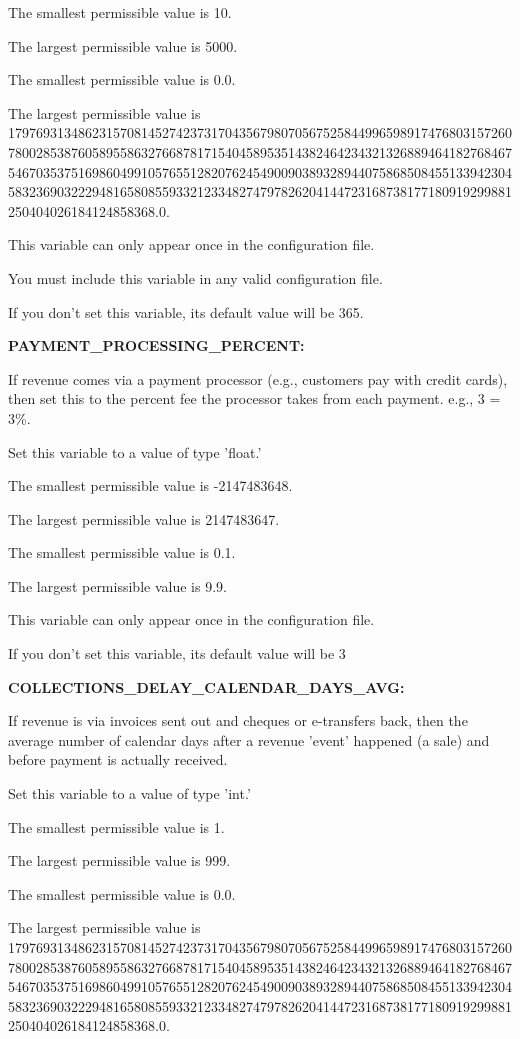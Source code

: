The smallest permissible value is 10.

The largest permissible value is 5000.

The smallest permissible value is 0.0.

The largest permissible value is 179769313486231570814527423731704356798070567525844996598917476803157260780028538760589558632766878171540458953514382464234321326889464182768467546703537516986049910576551282076245490090389328944075868508455133942304583236903222948165808559332123348274797826204144723168738177180919299881250404026184124858368.0.

This variable can only appear once in the configuration file.

You must include  this variable in any valid configuration file.

If you don't set this variable, its default value will be 365.


\textbf{PAYMENT\_PROCESSING\_PERCENT:}


If revenue comes via a payment processor (e.g., customers pay with credit cards), then set this to the percent fee the processor takes from each payment.  e.g., 3 = 3\%.

Set this variable to a value of type 'float.'

The smallest permissible value is -2147483648.

The largest permissible value is 2147483647.

The smallest permissible value is 0.1.

The largest permissible value is 9.9.

This variable can only appear once in the configuration file.

If you don't set this variable, its default value will be 3


\textbf{COLLECTIONS\_DELAY\_CALENDAR\_DAYS\_AVG:}


If revenue is via invoices sent out and cheques or e-transfers back, then the average number of calendar days after a revenue 'event' happened (a sale) and before payment is actually received.

Set this variable to a value of type 'int.'

The smallest permissible value is 1.

The largest permissible value is 999.

The smallest permissible value is 0.0.

The largest permissible value is 179769313486231570814527423731704356798070567525844996598917476803157260780028538760589558632766878171540458953514382464234321326889464182768467546703537516986049910576551282076245490090389328944075868508455133942304583236903222948165808559332123348274797826204144723168738177180919299881250404026184124858368.0.

